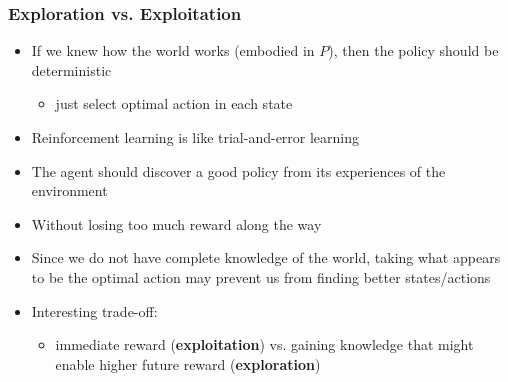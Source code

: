 \documentclass{beamer}
\renewcommand{\high}{\textbf}
\begin{document}
\begin{frame}\frametitle{Exploration vs. Exploitation}\small
\begin{itemize}
\item If we knew how the world works (embodied in $P$), then the policy should be deterministic 
\begin{itemize}
\item  just select optimal action in each state
\end{itemize}
\item Reinforcement learning is like trial-and-error learning
\item The agent should discover a good policy from its experiences of the environment
\item Without losing too much reward along the way

\item Since we do not have complete knowledge of the world, taking what appears to be the optimal action may prevent us from finding better states/actions
\item Interesting trade-off: 
\begin{itemize}
\item immediate reward (\high{exploitation}) vs. gaining knowledge that might enable higher future reward (\high{exploration})
\end{itemize}
\end{itemize}
\end{frame}
\end{document}
